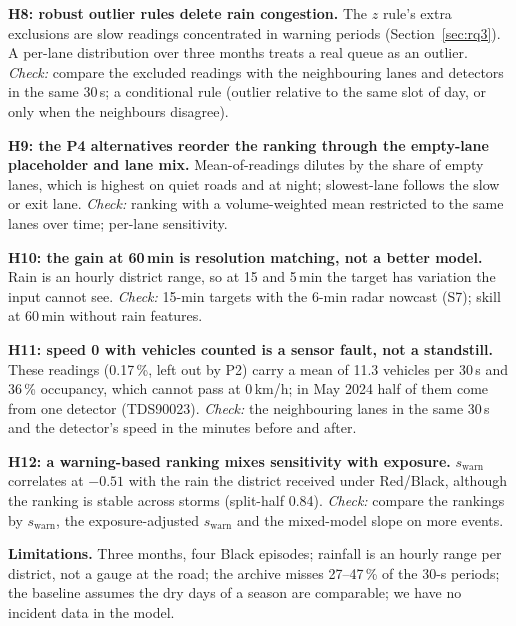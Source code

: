 \documentclass[conference]{IEEEtran}
\begin{document}
\textbf{H8: robust outlier rules delete rain congestion.} The $z$ rule's extra exclusions are
slow readings concentrated in warning periods (Section~\ref{sec:rq3}). A per-lane
distribution over three months treats a real queue as an outlier. \emph{Check:} compare the
excluded readings with the neighbouring lanes and detectors in the same 30\,s; a conditional
rule (outlier relative to the same slot of day, or only when the neighbours disagree).

\textbf{H9: the P4 alternatives reorder the ranking through the empty-lane placeholder and
lane mix.} Mean-of-readings dilutes by the share of empty lanes, which is highest on quiet
roads and at night; slowest-lane follows the slow or exit lane. \emph{Check:} ranking with a
volume-weighted mean restricted to the same lanes over time; per-lane sensitivity.

\textbf{H10: the gain at 60\,min is resolution matching, not a better model.} Rain is an
hourly district range, so at 15 and 5\,min the target has variation the input cannot see.
\emph{Check:} 15-min targets with the 6-min radar nowcast (S7); skill at 60\,min without rain
features.

\textbf{H11: speed 0 with vehicles counted is a sensor fault, not a standstill.} These
readings (0.17\,\%, left out by P2) carry a mean of 11.3 vehicles per 30\,s and 36\,\%
occupancy, which cannot pass at 0\,km/h; in May 2024 half of them come from one detector
(TDS90023). \emph{Check:} the neighbouring lanes in the same 30\,s and the detector's speed in
the minutes before and after.

\textbf{H12: a warning-based ranking mixes sensitivity with exposure.} $s_{\mathrm{warn}}$
correlates at $-0.51$ with the rain the district received under Red/Black, although the
ranking is stable across storms (split-half 0.84). \emph{Check:} compare the rankings by $s_{\mathrm{warn}}$, the
exposure-adjusted $s_{\mathrm{warn}}$ and the mixed-model slope on more events.

\textbf{Limitations.} Three months, four Black episodes; rainfall is an hourly range per
district, not a gauge at the road; the archive misses 27--47\,\% of the 30-s periods; the
baseline assumes the dry days of a season are comparable; we have no incident data in the
model.
\end{document}
